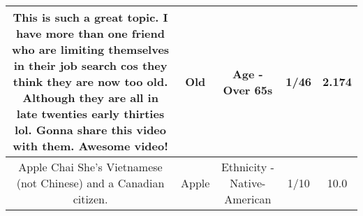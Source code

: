 \documentclass[11pt]{article}
\newlength\mylength
\begin{document}
\begin{center}
\begin{longtable}{|C{.65\mylength}|C{.30\mylength}|C{.12\mylength}|C{.12\mylength}|C{.12\mylength}|}
  \small This is such a great topic. I have more than one friend who are limiting themselves in their job search cos they think they are now too \textbf{old}. Although they are all in late twenties early thirties lol. Gonna share this video with them. Awesome video!\normalsize   & Old & Age - Over 65s & 1/46 & 2.174 \\  \hline
  \small Apple Chai She's Vietnamese (not Chinese) and a Canadian citizen.\normalsize   & Apple & Ethnicity - Native-American & 1/10 & 10.0 \\  \hline
  
\end{longtable}
\end{center}
\end{document}
